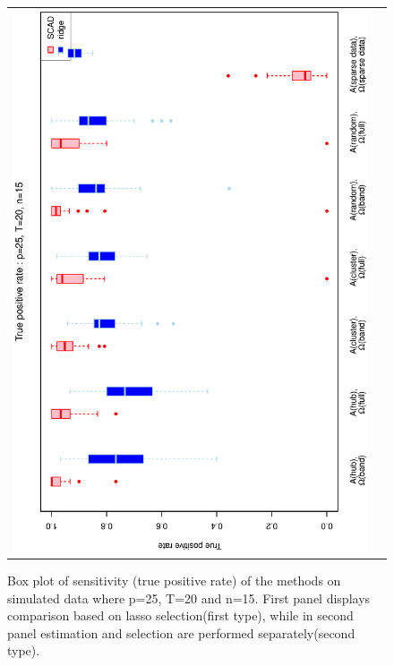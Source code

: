 \documentclass[a4paper]{article}
\begin{document}
\begin{figure}[h!]
\begin{tabular}{cc}
\includegraphics[scale=0.5,angle=270]{ROCtpr25T20N15b.eps}\\
\end{tabular}
\caption{Box plot of sensitivity (true positive rate) of the methods on simulated data where p=25, T=20 and n=15. First panel displays comparison based on lasso selection(first type), while in second panel estimation and selection are performed separately(second type).}
\label{fig:tpr25T20N15}
\end{figure}
\end{document}
